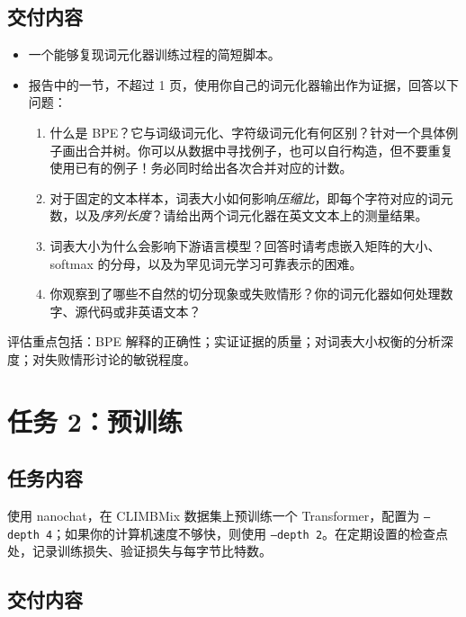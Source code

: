 \subsection{交付内容}

\begin{itemize}
    \item 一个能够复现词元化器训练过程的简短脚本。
    \item 报告中的一节，不超过 1 页，使用你自己的词元化器输出作为证据，回答以下问题：
          \begin{enumerate}
              \item 什么是 BPE？它与词级词元化、字符级词元化有何区别？针对一个具体例子画出合并树。你可以从数据中寻找例子，也可以自行构造，但不要重复使用已有的例子！务必同时给出各次合并对应的计数。
              \item 对于固定的文本样本，词表大小如何影响\emph{压缩比}，即每个字符对应的词元数，以及\emph{序列长度}？请给出两个词元化器在英文文本上的测量结果。
              \item 词表大小为什么会影响下游语言模型？回答时请考虑嵌入矩阵的大小、softmax 的分母，以及为罕见词元学习可靠表示的困难。
              \item 你观察到了哪些不自然的切分现象或失败情形？你的词元化器如何处理数字、源代码或非英语文本？
          \end{enumerate}
\end{itemize}
评估重点包括：BPE 解释的正确性；实证证据的质量；对词表大小权衡的分析深度；对失败情形讨论的敏锐程度。

\section{任务 2：预训练}
\label{sec:task2}

\subsection{任务内容}

使用 nanochat，在 CLIMBMix 数据集上预训练一个 Transformer，配置为 \texttt{--depth~4}；如果你的计算机速度不够快，则使用 \texttt{--depth~2}。在定期设置的检查点处，记录训练损失、验证损失与每字节比特数。

\subsection{交付内容}

